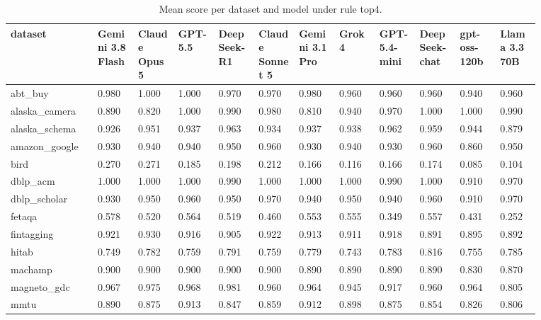 \begin{landscape}
\tiny
\setlength{\tabcolsep}{3pt}
\begin{longtable}{p{0.134\linewidth}p{0.067\linewidth}p{0.067\linewidth}p{0.067\linewidth}p{0.067\linewidth}p{0.067\linewidth}p{0.067\linewidth}p{0.067\linewidth}p{0.067\linewidth}p{0.067\linewidth}p{0.067\linewidth}p{0.067\linewidth}}
\caption{Mean score per dataset and model under rule top4.}\label{tab:per_dataset_mean_top4}\\
\toprule
dataset & Gemini 3.8 Flash & Claude Opus 5 & GPT-5.5 & DeepSeek-R1 & Claude Sonnet 5 & Gemini 3.1 Pro & Grok 4 & GPT-5.4-mini & DeepSeek-chat & gpt-oss-120b & Llama 3.3 70B \\
\midrule
abt\_\allowbreak{}buy & 0.980 & 1.000 & 1.000 & 0.970 & 0.970 & 0.980 & 0.960 & 0.960 & 0.960 & 0.940 & 0.960 \\
alaska\_\allowbreak{}camera & 0.890 & 0.820 & 1.000 & 0.990 & 0.980 & 0.810 & 0.940 & 0.970 & 1.000 & 1.000 & 0.990 \\
alaska\_\allowbreak{}schema & 0.926 & 0.951 & 0.937 & 0.963 & 0.934 & 0.937 & 0.938 & 0.962 & 0.959 & 0.944 & 0.879 \\
amazon\_\allowbreak{}google & 0.930 & 0.940 & 0.940 & 0.950 & 0.960 & 0.930 & 0.940 & 0.930 & 0.960 & 0.860 & 0.950 \\
bird & 0.270 & 0.271 & 0.185 & 0.198 & 0.212 & 0.166 & 0.116 & 0.166 & 0.174 & 0.085 & 0.104 \\
dblp\_\allowbreak{}acm & 1.000 & 1.000 & 1.000 & 0.990 & 1.000 & 1.000 & 1.000 & 0.990 & 1.000 & 0.910 & 0.970 \\
dblp\_\allowbreak{}scholar & 0.930 & 0.950 & 0.960 & 0.950 & 0.970 & 0.940 & 0.950 & 0.940 & 0.960 & 0.910 & 0.970 \\
fetaqa & 0.578 & 0.520 & 0.564 & 0.519 & 0.460 & 0.553 & 0.555 & 0.349 & 0.557 & 0.431 & 0.252 \\
fintagging & 0.921 & 0.930 & 0.916 & 0.905 & 0.922 & 0.913 & 0.911 & 0.918 & 0.891 & 0.895 & 0.892 \\
hitab & 0.749 & 0.782 & 0.759 & 0.791 & 0.759 & 0.779 & 0.743 & 0.783 & 0.816 & 0.755 & 0.785 \\
machamp & 0.900 & 0.900 & 0.900 & 0.900 & 0.900 & 0.890 & 0.890 & 0.890 & 0.890 & 0.830 & 0.870 \\
magneto\_\allowbreak{}gdc & 0.967 & 0.975 & 0.968 & 0.981 & 0.960 & 0.964 & 0.945 & 0.917 & 0.960 & 0.964 & 0.805 \\
mmtu & 0.890 & 0.875 & 0.913 & 0.847 & 0.859 & 0.912 & 0.898 & 0.875 & 0.854 & 0.826 & 0.806 \\

\end{longtable}
\end{landscape}
